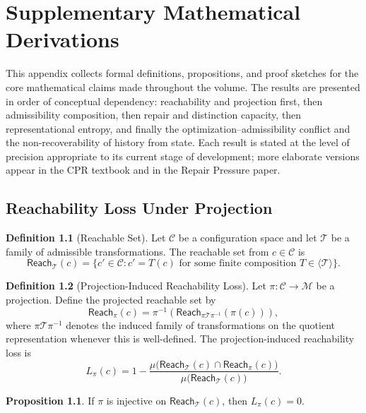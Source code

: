 \documentclass[11pt, oneside]{book}
\theoremstyle{definition}
\newtheorem{definition}{Definition}[chapter]
\newtheorem{proposition}{Proposition}[chapter]
\theoremstyle{remark}
\begin{document}
\chapter{Supplementary Mathematical Derivations}\label{app:math}

This appendix collects formal definitions, propositions, and proof sketches for the core mathematical claims made throughout the volume. The results are presented in order of conceptual dependency: reachability and projection first, then admissibility composition, then repair and distinction capacity, then representational entropy, and finally the optimization--admissibility conflict and the non-recoverability of history from state. Each result is stated at the level of precision appropriate to its current stage of development; more elaborate versions appear in the CPR textbook and in the Repair Pressure paper.

\section{Reachability Loss Under Projection}

\begin{definition}[Reachable Set]
Let $\mathcal{C}$ be a configuration space and let $\mathcal{T}$ be a family of admissible transformations. The reachable set from $c \in \mathcal{C}$ is
\[
\mathsf{Reach}_{\mathcal{T}}(c) = \{c' \in \mathcal{C} : c' = T(c) \text{ for some finite composition } T \in \langle \mathcal{T} \rangle \}.
\]
\end{definition}

\begin{definition}[Projection-Induced Reachability Loss]
Let $\pi:\mathcal{C}\to\mathcal{M}$ be a projection. Define the projected reachable set by
\[
\mathsf{Reach}_{\pi}(c) = \pi^{-1}\!\left(\mathsf{Reach}_{\pi\mathcal{T}\pi^{-1}}(\pi(c))\right),
\]
where $\pi\mathcal{T}\pi^{-1}$ denotes the induced family of transformations on the quotient representation whenever this is well-defined. The projection-induced reachability loss is
\[
L_{\pi}(c) = 1 - \frac{\mu\bigl(\mathsf{Reach}_{\mathcal{T}}(c)\cap \mathsf{Reach}_{\pi}(c)\bigr)}{\mu\bigl(\mathsf{Reach}_{\mathcal{T}}(c)\bigr)}.
\]
\end{definition}

\begin{proposition}
If $\pi$ is injective on $\mathsf{Reach}_{\mathcal{T}}(c)$, then $L_{\pi}(c)=0$.
\end{proposition}
\end{document}
